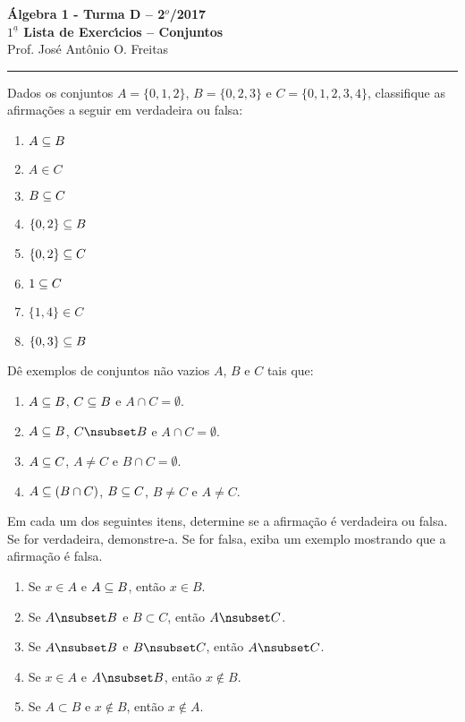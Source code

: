 \documentclass[12pt]{article}
\begin{document}


\begin{center}
{\Large\bf {\'A}lgebra 1 - Turma D -- 2$^{o}$/2017} \\ \vspace{9pt} {\large\bf
  $1^{\underline{a}}$ Lista de Exerc{\'\i}cios -- Conjuntos}\\
\vspace{9pt} Prof. Jos{\'e} Ant{\^o}nio O. Freitas
\end{center}
\hrule

\vspace{.6cm}

\questao Dados os conjuntos $A = \{0,1,2\}$, $B = \{0,2,3\}$ e $C = \{0,1,2,3,4\}$, classifique as afirmações a seguir em verdadeira ou falsa:
\begin{multicols}{2}
	\begin{enumerate}[label={\alph*})]
		\item $A \subseteq B$
		\item $A \in C$
		\item $B \subseteq C$
		\item $\{0,2\} \subseteq B$
		\item $\{0,2\} \subseteq C$
		\item $1 \subseteq C$
		\item $\{1,4\} \in C$
		\item $\{0,3\} \subseteq B$
	\end{enumerate}	
\end{multicols}

\questao Dê exemplos de conjuntos não vazios $A$, $B$ e $C$ tais que:
\begin{enumerate}[label={\alph*})]
	\item $A \subseteq B$, $C \subseteq B$ e $A \cap C = \emptyset$.
	\item $A \subseteq B$, $C \nsub B$ e $A \cap C = \emptyset$.
	\item $A \subseteq C$, $A \ne C$ e $B \cap C = \emptyset$.
	\item $A \subseteq (B \cap C)$, $B \subseteq C$, $B \ne C$ e $A \ne C$.
\end{enumerate}

\vspace{.3cm}

\questao Em cada um dos seguintes itens, determine se a afirma{\c c}{\~a}o {\'e}
verdadeira ou falsa. Se for verdadeira, demonstre-a. Se for falsa, exiba um
exemplo mostrando que a afirma{\c c}{\~a}o {\'e} falsa.
\begin{enumerate}[label={\alph*})]
\item Se $x \in A$ e $A \subseteq B$, ent{\~a}o $x \in B$.

\item Se $A \nsub B$ e $B \subset C$, ent{\~a}o $A \nsub C$.

\item Se $A \nsub B$ e $B \nsub C$, ent{\~a}o $A \nsub C$.

\item Se $x \in A$ e $A \nsub B$, ent{\~a}o $x \notin B$.

\item Se $A \subset B$ e $x \notin B$, ent{\~a}o $x \notin A$.
\end{enumerate}
\end{document}
